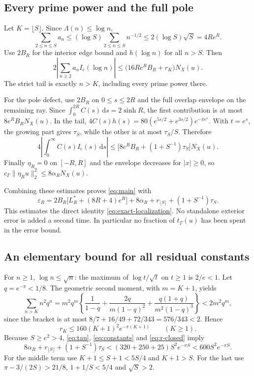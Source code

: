 \documentclass[11pt]{article}
\theoremstyle{remark}\newtheorem{remark}[theorem]{Remark}
\newcommand{\dd}{\,\mathrm d}
\newcommand{\norm}[1]{\lVert#1\rVert}
\numberwithin{equation}{section}
\begin{document}
\subsection{Every prime power and the full pole}
Let $K=\lfloor S\rfloor$. Since $\Lambda(n)\le\log n$,
\[
 \sum_{2\le n\le S}a_n
 \le(\log S)\sum_{2\le n\le S}n^{-1/2}
 \le2(\log S)\sqrt S=4Re^R.
\]
Use $2B_R$ for the interior edge bound and $h(\log n)$ for all $n>S$.
Then
\begin{equation}\label{eq:prime-error}
 2\left|\sum_{n\ge2}a_nI_e(\log n)\right|
 \le\bigl(16Re^RB_R+r_K\bigr)N_X(u).
\end{equation}
The strict tail is exactly $n>K$, including every prime power there.

For the pole defect, use $2B_R$ on $0\le s\le2R$ and the full overlap
envelope on the remaining ray. Since $\int_0^{2R}C(s)\dd s=2\sinh R$,
the first contribution is at most $8e^RB_RN_X(u)$. In the tail,
$4C(s)h(s)=80(e^{5s/2}+e^{3s/2})e^{-\pi e^s}$.
With $t=e^s$, the growing part gives $\tau_S$, while the other is at
most $\tau_S/S$. Therefore
\begin{equation}\label{eq:pole-error}
 4\left|\int_0^\infty C(s)I_e(s)\dd s\right|
 \le\bigl[8e^RB_R+(1+S^{-1})\tau_S\bigr]N_X(u).
\end{equation}
Finally $\eta_R=0$ on $[-R,R]$ and the envelope decreases for $|x|\ge0$,
so $c_\Gamma\norm{\eta_Ru}_2^2\le8\alpha_RN_X(u)$.

Combining these estimates proves \eqref{eq:main} with
\begin{equation}\label{eq:eps}
 \boxed{\displaystyle
 \varepsilon_R=2B_R\bigl[L_R^*+(8R+4)e^R\bigr]
       +8\alpha_R+r_{\lfloor S\rfloor}+(1+S^{-1})\tau_S.}
\end{equation}
This estimates the direct identity \eqref{eq:exact-localization}. No
standalone exterior error is added a second time. In particular no fraction
of $t_\Gamma(u)$ has been spent in the error bound.

\subsection{An elementary bound for all residual constants}
For $n\ge1$, $\log n\le\sqrt n$: the maximum of
$\log t/\sqrt t$ on $t\ge1$ is $2/e<1$. Let $q=e^{-\pi}<1/8$.
The geometric second moment, with $m=K+1$, yields
\[
 \sum_{n>K}n^2q^n
 =m^2q^m\left\{\frac1{1-q}
       +\frac{2q}{m(1-q)^2}
       +\frac{q(1+q)}{m^2(1-q)^3}\right\}
 <2m^2q^m,
\]
since the bracket is at most
$8/7+16/49+72/343=576/343<2$. Hence
\begin{equation}\label{eq:r-closed}
 r_K\le160(K+1)^2e^{-\pi(K+1)}\qquad(K\ge1).
\end{equation}
Because $S\ge e^2>4$, \eqref{eq:tau}, \eqref{eq:constants} and
\eqref{eq:r-closed} imply
\begin{equation}\label{eq:residual-closed}
 8\alpha_R+r_{\lfloor S\rfloor}+(1+S^{-1})\tau_S
 <(320+250+25)S^2e^{-\pi S}<600S^2e^{-\pi S}.
\end{equation}
For the middle term use $K+1\le S+1<5S/4$ and $K+1>S$.
For the last use $\pi-3/(2S)>21/8$, $1+1/S<5/4$ and $\sqrt S>2$.
\end{document}
